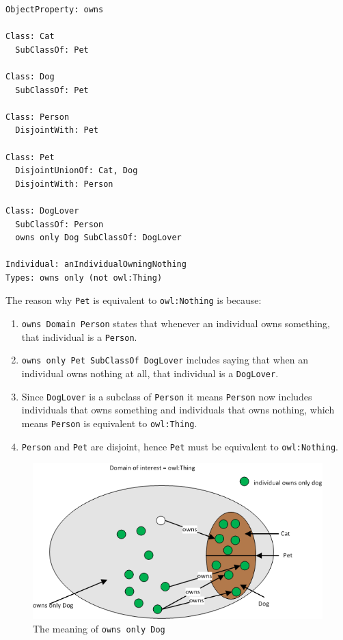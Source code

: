 \documentclass{amsart}
\begin{document}
\begin{small}
\begin{verbatim} 
ObjectProperty: owns
        
Class: Cat
  SubClassOf: Pet
    
Class: Dog
  SubClassOf: Pet
    
Class: Person
  DisjointWith: Pet
        
Class: Pet
  DisjointUnionOf: Cat, Dog
  DisjointWith: Person
  
Class: DogLover
  SubClassOf: Person
  owns only Dog SubClassOf: DogLover
  
Individual: anIndividualOwningNothing
Types: owns only (not owl:Thing)
\end{verbatim}
\end{small} 

The reason why \texttt{Pet} is equivalent to \texttt{owl:Nothing} is because:
\begin{enumerate}
 \item \texttt{owns Domain Person} states that whenever an individual owns something, that individual is a \texttt{Person}. 
 \item \texttt{owns only Pet SubClassOf DogLover} includes saying that when an individual owns nothing at all, that individual is a \texttt{DogLover}.
 \item Since \texttt{DogLover} is a subclass of \texttt{Person} it means \texttt{Person} now includes individuals that owns something and individuals that owns nothing, which means \texttt{Person} is equivalent to \texttt{owl:Thing}.
 \item \texttt{Person} and \texttt{Pet} are disjoint, hence \texttt{Pet} must be equivalent to \texttt{owl:Nothing}.
\end{enumerate}

    \begin{figure}
      \centering \includegraphics[trim = 0mm 0mm 0mm 0mm, clip, scale=1]{./OwnsOnlyDog.png}
      \caption{The meaning of \texttt{owns only Dog}}\label{fig_OwnsOnlyDog}
    \end{figure}
\end{document}
